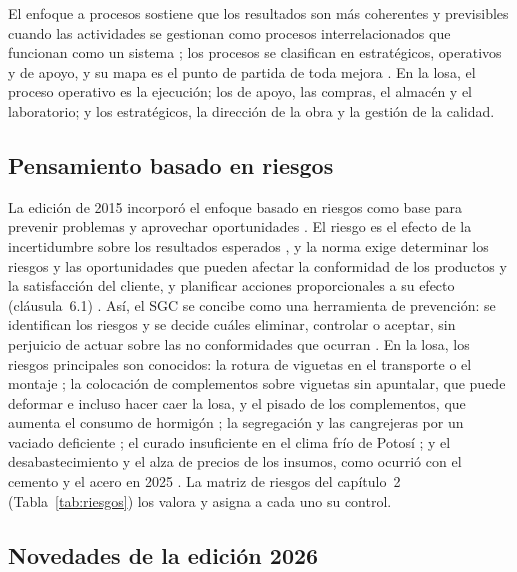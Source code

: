 El enfoque a procesos sostiene que los resultados son más coherentes y previsibles cuando las actividades se gestionan como procesos interrelacionados que funcionan como un sistema \parencite[p.~59]{pena2024}; los procesos se clasifican en estratégicos, operativos y de apoyo, y su mapa es el punto de partida de toda mejora \parencite[pp.~18, 50]{zurita2024}. En la losa, el proceso operativo es la ejecución; los de apoyo, las compras, el almacén y el laboratorio; y los estratégicos, la dirección de la obra y la gestión de la calidad.

\subsection{Pensamiento basado en riesgos}

La edición de 2015 incorporó el enfoque basado en riesgos como base para prevenir problemas y aprovechar oportunidades \parencite[p.~20]{mamanicalsina2025}. El riesgo es el efecto de la incertidumbre sobre los resultados esperados \parencite[p.~22]{mamanicalsina2025}, y la norma exige determinar los riesgos y las oportunidades que pueden afectar la conformidad de los productos y la satisfacción del cliente, y planificar acciones proporcionales a su efecto (cláusula~6.1) \parencite{iso9001_2026}. Así, el SGC se concibe como una herramienta de prevención: se identifican los riesgos y se decide cuáles eliminar, controlar o aceptar, sin perjuicio de actuar sobre las no conformidades que ocurran \parencite[pp.~57--58]{pena2024}. En la losa, los riesgos principales son conocidos: la rotura de viguetas en el transporte o el montaje \parencite[p.~116]{alcon2009}; la colocación de complementos sobre viguetas sin apuntalar, que puede deformar e incluso hacer caer la losa, y el pisado de los complementos, que aumenta el consumo de hormigón \parencite[hoja~3]{concretec2016plastoformo}; la segregación y las cangrejeras por un vaciado deficiente \parencite[p.~17]{muro2020}; el curado insuficiente en el clima frío de Potosí \parencite[sección~26.5.4.2]{aci318_2025}; y el desabastecimiento y el alza de precios de los insumos, como ocurrió con el cemento y el acero en 2025 \parencite{fancesa2025,laslomas2025}. La matriz de riesgos del capítulo~2 (Tabla~\ref{tab:riesgos}) los valora y asigna a cada uno su control.

\subsection{Novedades de la edición 2026}
\label{sec:iso2026}

